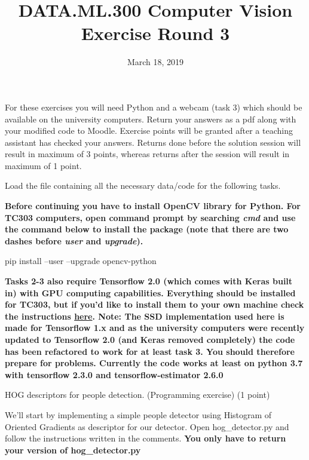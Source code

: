 \documentclass[12pt]{article} %
\title{DATA.ML.300 Computer Vision\\ Exercise Round 3}
\date{\vspace{-5mm} March 18, 2019}
\date{} %
\newenvironment{exercise}[2][Task]{\begin{trivlist}
\item[\hskip \labelsep {\bfseries #1}\hskip \labelsep {\bfseries #2.}]}{\end{trivlist}}
\begin{document}
\maketitle


\noindent For these exercises you will need Python and a webcam (task 3) which should be available on the university computers. Return your answers as a pdf along with your modified code to Moodle. Exercise points will be granted after a teaching assistant has checked your answers. Returns done before the solution session will result in maximum of 3 points, whereas returns after the session will result in maximum of 1 point.

\noindent Load the file containing all the necessary data/code for the following tasks.
\newline

\noindent \textbf{Before continuing you have to install OpenCV library for Python. For TC303 computers, open command prompt by searching \textit{cmd} and use the command below to install the package (note that there are two dashes before \textit{user} and \textit{upgrade}).}
\newline

pip install --user --upgrade opencv-python
\newline

\noindent \textbf{Tasks 2-3 also require Tensorflow 2.0 (which comes with Keras built in) with GPU computing capabilities. Everything should be installed for TC303, but if you'd like to install them to your own machine check the instructions \href{https://www.tensorflow.org/install/gpu}{here}. \newline\newline Note: The SSD implementation used here is made for Tensorflow 1.x and as the university computers were recently updated to Tensorflow 2.0 (and Keras removed completely) the code has been refactored to work for at least task 3. You should therefore prepare for problems. Currently the code works
at least on python 3.7 with tensorflow 2.3.0 and tensorflow-estimator 2.6.0}
\newline

\begin{exercise}{1}
	HOG descriptors for people detection. (Programming exercise) (1 point)
	
	\noindent We'll start by implementing a simple people detector using Histogram of Oriented Gradients as descriptor for our detector. Open hog\_detector.py and follow the instructions written in the comments. \textbf{You only have to return your version of hog\_detector.py}
	
\end{exercise}
\end{document}
